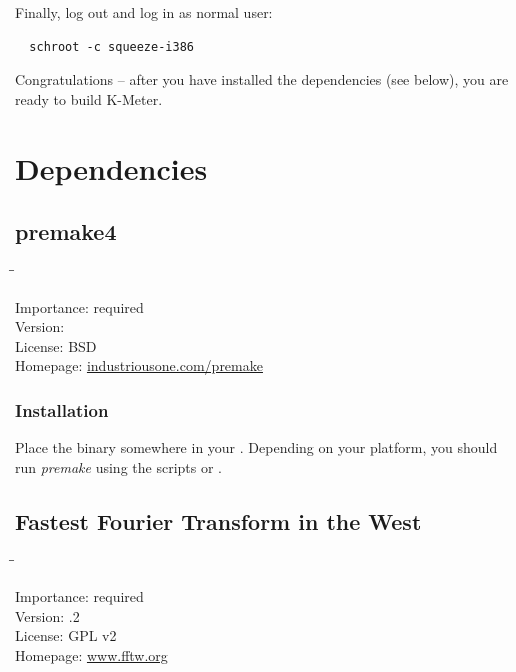 Finally, log out and log in as normal user:

\begin{verbatim}
  schroot -c squeeze-i386
\end{verbatim}

Congratulations -- after you have installed the dependencies (see
below), you are ready to build K-Meter.

\section{Dependencies}

\subsection{premake4}

\begin{tabbing}
  \hspace*{6em}\=\=\kill

  Importance:  \> required \\
  Version:      \\
  License:     \> BSD \\
  Homepage:    \> \href{http://industriousone.com/premake}{industriousone.com/premake}
\end{tabbing}

\subsubsection{Installation}

Place the binary somewhere in your .  Depending on your
platform, you should run \emph{premake} using the scripts
 or .

\newpage %

\subsection{Fastest Fourier Transform in the West}

\begin{tabbing}
  \hspace*{6em}\=\=\kill

  Importance:  \> required \\
  Version:     .2 \\
  License:     \> GPL v2 \\
  Homepage:    \> \href{http://www.fftw.org/}{www.fftw.org}
\end{tabbing}

